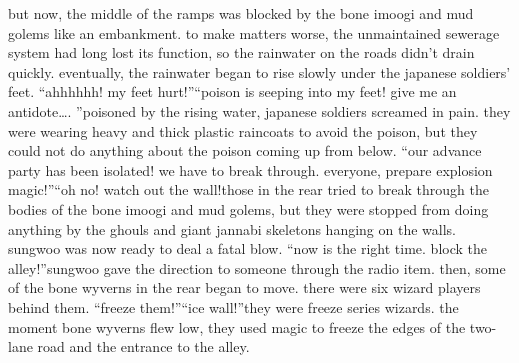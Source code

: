 but now, the middle of the ramps was blocked by the bone imoogi and mud golems like an embankment.
 to make matters worse, the unmaintained sewerage system had long lost its function, so the rainwater on the roads didn’t drain quickly.
eventually, the rainwater began to rise slowly under the japanese soldiers’ feet.
“ahhhhhh! my feet hurt!”“poison is seeping into my feet! give me an antidote….
”poisoned by the rising water, japanese soldiers screamed in pain.
 they were wearing heavy and thick plastic raincoats to avoid the poison, but they could not do anything about the poison coming up from below.
“our advance party has been isolated! we have to break through.
 everyone, prepare explosion magic!”“oh no! watch out the wall!those in the rear tried to break through the bodies of the bone imoogi and mud golems, but they were stopped from doing anything by the ghouls and giant jannabi skeletons hanging on the walls.
sungwoo was now ready to deal a fatal blow.
“now is the right time.
 block the alley!”sungwoo gave the direction to someone through the radio item.
 then, some of the bone wyverns in the rear began to move.
 there were six wizard players behind them.
“freeze them!”“ice wall!”they were freeze series wizards.
 the moment bone wyverns flew low, they used magic to freeze the edges of the two-lane road and the entrance to the alley.

